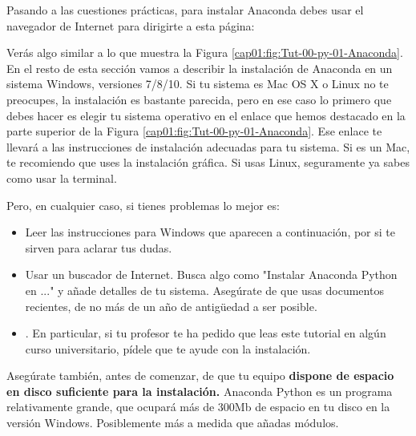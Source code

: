 \documentclass[10pt,a4paper]{article}\usepackage[]{graphicx}\usepackage[]{color}
\newcounter {cont01}
\begin{document}
Pasando a las cuestiones prácticas, para instalar Anaconda debes usar el  navegador de Internet para dirigirte a esta página:
\begin{center}
\end{center}
Verás algo similar a lo que muestra la Figura \ref{cap01:fig:Tut-00-py-01-Anaconda}. En el resto de esta sección vamos a describir la instalación de Anaconda en un sistema Windows, versiones 7/8/10. Si tu sistema es Mac OS X o Linux no te preocupes, la instalación es bastante parecida, pero en ese caso lo primero que debes hacer es elegir tu sistema operativo en el enlace que hemos destacado en la parte superior de la Figura \ref{cap01:fig:Tut-00-py-01-Anaconda}. Ese enlace te llevará a las instrucciones de instalación adecuadas para tu sistema. Si es un Mac, te recomiendo que uses la instalación gráfica. Si usas Linux,  seguramente ya sabes como usar la terminal.

Pero, en cualquier caso, si tienes problemas lo mejor es:
\begin{itemize}
  \item Leer las instrucciones para Windows que aparecen a continuación, por si te sirven para aclarar tus dudas.
  \item Usar un buscador de Internet. Busca algo como "Instalar Anaconda Python en ..." y añade detalles de tu sistema. Asegúrate de que usas documentos recientes, de no más de un año de antigüedad a ser posible.
  \item {}. En particular, si tu profesor te ha pedido que leas este tutorial en algún curso universitario, pídele que te ayude con la instalación.
\end{itemize}

Asegúrate también, antes de comenzar, de que tu equipo {\bf dispone de espacio en disco suficiente para la instalación.} Anaconda Python es un programa relativamente grande, que ocupará más de 300Mb de espacio en tu disco en la versión Windows. Posiblemente más a medida que añadas módulos.
\end{document}
